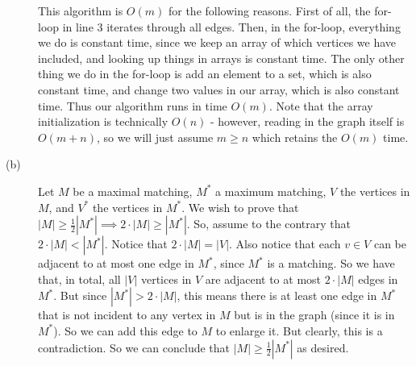\documentclass{article}
\begin{document}
\begin{description}
        This algorithm is $O(m)$ for the following reasons. First of all, the
        for-loop in line 3 iterates through all edges. Then, in
        the for-loop, everything we do is constant time, since we keep an array
        of which vertices we have included, and looking up things in arrays is
        constant time. The only other thing we do in the for-loop is add an
        element to a set, which is also constant time, and change two values in our
        array, which is also constant time. Thus our algorithm runs
        in time $O(m)$. Note that the array initialization is technically $O(n)$
        - however, reading in the graph itself is $O(m+n)$, so we will just
        assume $m \geq n$ which retains the $O(m)$ time.
    \item[(b)]
        Let $M$ be a maximal matching, $M^*$ a maximum matching, $V$ the
        vertices in $M$, and $V^*$ the vertices in $M^*$.
        We wish to prove that $|M| \geq \frac{1}{2} |M^*|
        \implies 2 \cdot |M| \geq |M^*|$. So, assume to the contrary that $2
        \cdot |M| < |M^*|$. Notice that $2 \cdot |M| = |V|$. Also
        notice that each $v \in V$ can be adjacent to at most one edge in $M^*$,
        since $M^*$ is a matching.
        So we have that, in total, all $|V|$ vertices in $V$ are adjacent to at most $2 \cdot |M|$
        edges in $M^*$. But since $|M^*| > 2 \cdot |M|$, this means there is
        at least one edge in
        $M^*$ that is not incident to any vertex in $M$
        but is in the graph (since it is in $M^*$). So we can add this edge to $M$ to enlarge it.
        But clearly, this is a contradiction. So we can conclude that $|M| \geq
        \frac{1}{2} |M^*|$ as desired.
\end{description}
\newpage

\end{document}
